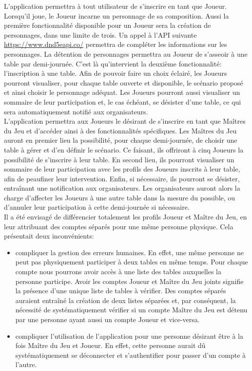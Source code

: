 \documentclass[11pt]{article}
\begin{document}
L'application permettra à tout utilisateur de s'inscrire en tant que Joueur. Lorsqu'il joue, le Joueur incarne un personnage de sa composition. Aussi la première fonctionnalité disponible pour un Joueur sera la création de personnages, dans une limite de trois. Un appel à l'API suivante \textcolor{blue}{\href{https://www.dnd5eapi.co/}{https://www.dnd5eapi.co/}} permettra de compléter les informations sur les personnages. La détention de personnages permettra au Joueur de s'asseoir à une table par demi-journée. C'est là qu'intervient la deuxième fonctionnalité: l'inscription à une table. Afin de pouvoir faire un choix éclairé, les Joueurs pourront visualiser, pour chaque table ouverte et disponible, le scénario proposé et ainsi choisir le personnage adéquat. Les Joueurs pourront aussi visualiser un sommaire de leur participation et, le cas échéant, se désister d'une table, ce qui sera automatiquement notifié aux organisateurs.\\

L'application permettra aux Joueurs le désirant de s'inscrire en tant que Maîtres du Jeu et d'accéder ainsi à des fonctionnalités spécifiques. Les Maîtres du Jeu auront en premier lieu la possibilité, pour chaque demi-journée, de choisir une table à gérer et d'en définir le scénario. Ce faisant, ils offriront à cinq Joueurs la possibilité de s'inscrire à leur table. En second lieu, ils pourront visualiser un sommaire de leur participation avec les profils des Joueurs inscrits à leur table, afin de peaufiner leur intervention. Enfin, si nécessaire, ils pourront se désister, entraînant une notification aux organisateurs. Les organisateurs auront alors la charge d'affecter les Joueurs à une autre table dans la mesure du possible, ou d'annuler leur participation à cette demi-journée si nécessaire.\\

\indent Il a été envisagé de différencier totalement les profils Joueur et Maître du Jeu, en leur attribuant des comptes séparés pour une même personne physique. Cela présentait deux inconvénients:
\begin{itemize}
\item{compliquer la gestion des erreurs humaines. En effet, une même personne ne peut pas physiquement participer à deux tables en même temps. Pour chaque compte nous pourrons avoir accès à une liste des tables auxquelles la personne participe. Avoir les comptes Joueur et Maître du Jeu joints signifie la présence d'une unique liste de tables à vérifier. Des comptes séparés auraient entraîné la création de deux listes séparées et, par conséquent, la nécessité de systématiquement vérifier si un compte Maître du Jeu est détenu par une personne ayant aussi un compte Joueur et vice-versa.}
\item{compliquer l'utilisation de l'application pour une personne désirant être à la fois Maître du Jeu et Joueur. En effet, cette personne aurait dû systématiquement se déconnecter et s'authentifier pour passer d'un compte à l'autre.\\}
\end{itemize}
\end{document}
